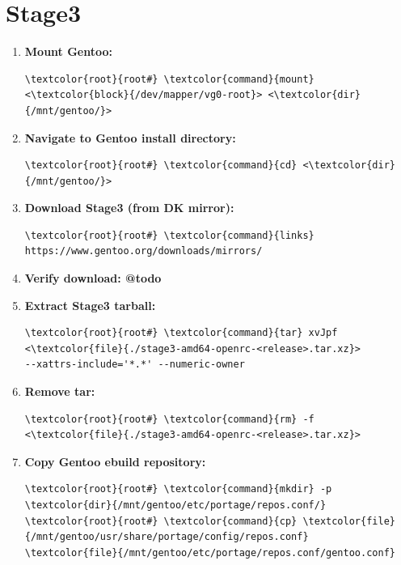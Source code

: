 \documentclass[10pt, a4paper, onecolumn, oneside, titlepage, openany]{book}
\begin{document}
\section{Stage3}
\begin{enumerate}
    \item \textbf{Mount Gentoo:}
\begin{Verbatim}[commandchars=\\\{\}]
\textcolor{root}{root#} \textcolor{command}{mount} <\textcolor{block}{/dev/mapper/vg0-root}> <\textcolor{dir}{/mnt/gentoo/}>
\end{Verbatim}
    \item \textbf{Navigate to Gentoo install directory:}
\begin{Verbatim}[commandchars=\\\{\}]
\textcolor{root}{root#} \textcolor{command}{cd} <\textcolor{dir}{/mnt/gentoo/}>
\end{Verbatim}
    \item \textbf{Download Stage3 (from DK mirror):}
\begin{Verbatim}[commandchars=\\\{\}]
\textcolor{root}{root#} \textcolor{command}{links} https://www.gentoo.org/downloads/mirrors/
\end{Verbatim}
    \item \textbf{Verify download: @todo}
    \item \textbf{Extract Stage3 tarball:}
\begin{Verbatim}[commandchars=\\\{\}]
\textcolor{root}{root#} \textcolor{command}{tar} xvJpf <\textcolor{file}{./stage3-amd64-openrc-<release>.tar.xz}>
--xattrs-include='*.*' --numeric-owner
\end{Verbatim}
    \item \textbf{Remove tar:}
\begin{Verbatim}[commandchars=\\\{\}]
\textcolor{root}{root#} \textcolor{command}{rm} -f <\textcolor{file}{./stage3-amd64-openrc-<release>.tar.xz}>
\end{Verbatim}
    \item \textbf{Copy Gentoo ebuild repository:}
\begin{Verbatim}[commandchars=\\\{\}]
\textcolor{root}{root#} \textcolor{command}{mkdir} -p \textcolor{dir}{/mnt/gentoo/etc/portage/repos.conf/}
\textcolor{root}{root#} \textcolor{command}{cp} \textcolor{file}{/mnt/gentoo/usr/share/portage/config/repos.conf}
\textcolor{file}{/mnt/gentoo/etc/portage/repos.conf/gentoo.conf}
\end{Verbatim}
\end{enumerate}
\end{document}
